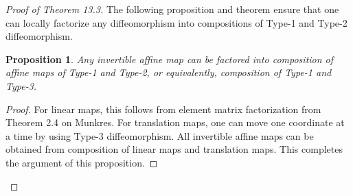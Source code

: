 \documentclass[11pt,oneside]{book}
\theoremstyle{break}
\theoremstyle{break}
\newtheorem{prop}[lem]{Proposition}
\begin{document}
\begin{proof}[Proof of Theorem 13.3]
The following proposition and theorem ensure that one can locally factorize any diffeomorphism into compositions of Type-1 and Type-2 diffeomorphism.

\begin{prop}\setlength{\leftskip}{1cm}
Any invertible affine map can be factored into composition of affine maps of Type-1 and Type-2, or equivalently, composition of Type-1 and Type-3.
\end{prop}
\begin{proof}\setlength{\leftskip}{1cm}
For linear maps, this follows from element matrix factorization from Theorem 2.4 on Munkres. For translation maps, one can move one coordinate at a time by using Type-3 diffeomorphism. All invertible affine maps can be obtained from composition of linear maps and translation maps. This completes the argument of this proposition.
\end{proof}


\end{proof}
\end{document}
